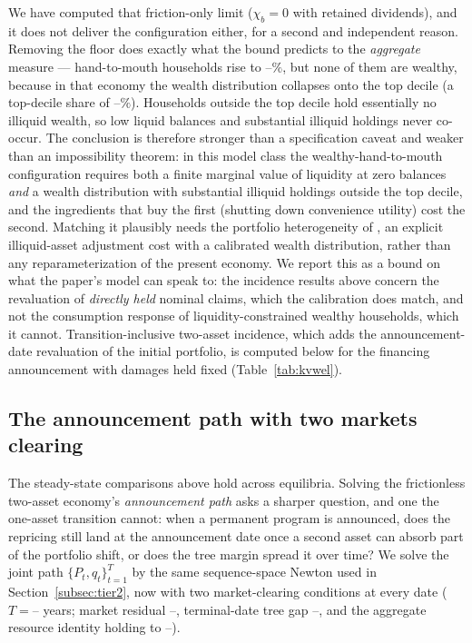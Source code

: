 \documentclass[12pt]{article}
\providecommand{\pendingnum}{\textit{--}}
\providecommand{\KmvHtM}{\pendingnum}
\providecommand{\KmvTopTen}{\pendingnum}
\providecommand{\TwoTrT}{\pendingnum}\providecommand{\TwoTrResid}{\pendingnum}
\providecommand{\TwoTrTermGap}{\pendingnum}\providecommand{\TwoTrIdent}{\pendingnum}
\begin{document}
We have computed that friction-only limit ($\chi_b = 0$ with retained
dividends), and it does not deliver the configuration either, for a
second and independent reason. Removing the floor does exactly what the
bound predicts to the \emph{aggregate} measure --- hand-to-mouth
households rise to $\KmvHtM\%$, but none of them are wealthy, because
in that economy the wealth distribution collapses onto the top decile
(a top-decile share of $\KmvTopTen\%$). Households outside the top decile
hold essentially no illiquid wealth, so low liquid balances and
substantial illiquid holdings never co-occur. The conclusion is
therefore stronger than a specification caveat and weaker than an
impossibility theorem: in this model class the wealthy-hand-to-mouth
configuration requires both a finite marginal value of liquidity at zero
balances \emph{and} a wealth distribution with substantial illiquid
holdings outside the top decile, and the ingredients that buy the first
(shutting down convenience utility) cost the second. Matching it plausibly
needs the portfolio heterogeneity of \citet{kaplan2018}, an explicit
illiquid-asset adjustment cost with a calibrated wealth distribution, rather than any reparameterization of the present economy. We report this
as a bound on what the paper's model can speak to: the incidence results
above concern the revaluation of \emph{directly held} nominal claims,
which the calibration does match, and not the consumption response of
liquidity-constrained wealthy households, which it cannot. Transition-inclusive
two-asset incidence, which adds the announcement-date revaluation of
the initial portfolio, is computed below for the financing announcement
with damages held fixed (Table~\ref{tab:kvwel}).

\subsection{The announcement path with two markets clearing}
\noindent The
steady-state comparisons above hold across equilibria. Solving the
frictionless two-asset economy's \emph{announcement path} asks a sharper
question, and one the one-asset transition cannot: when a permanent program
is announced, does the repricing still land at the announcement date once a
second asset can absorb part of the portfolio shift, or does the tree margin
spread it over time? We solve the joint path $\{P_t, q_t\}_{t=1}^{T}$ by the
same sequence-space Newton used in Section~\ref{subsec:tier2}, now with two
market-clearing conditions at every date ($T = \TwoTrT$ years; market
residual $\TwoTrResid$, terminal-date tree gap $\TwoTrTermGap$, and the
aggregate resource identity holding to $\TwoTrIdent$).
\end{document}
